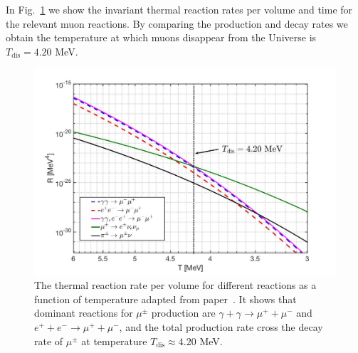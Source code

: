 \documentclass[universe,article,submit,moreauthors,pdftex,a4paper]{Definitions/mdpi}
\newcommand*{\rf}[1]{Fig.~{\ref{#1}}}
\begin{document}
In \rf{muon_fig} we show the invariant thermal reaction rates per volume and time for the relevant muon reactions. By comparing the production and decay rates we obtain the temperature at which muons disappear from the Universe is $T_\mathrm{dis} = 4.20$ MeV. 
\begin{figure}[t]
\centering
\includegraphics[width=0.9\columnwidth]{./plots/MuonRate_new2.jpg}
\caption{The thermal reaction rate per volume for different reactions as a function of temperature adapted from paper~\cite{Rafelski:2021aey}. It shows that dominant reactions for $\mu^\pm$ production are ${\gamma+\gamma\to\mu^++\mu^-}$ and $e^++e^-\to\mu^++\mu^-$, and the total production rate cross the decay rate of $\mu^\pm$ at temperature $T_\mathrm{dis}\approx 4.20$ MeV.}
\label{muon_fig} 
\end{figure}
\end{document}
